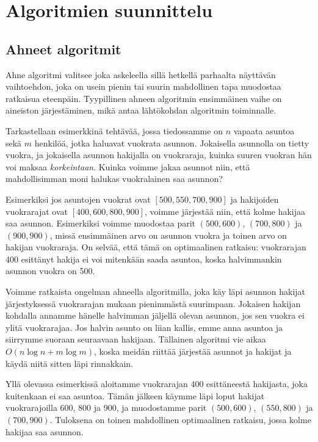 \chapter{Algoritmien suunnittelu}

\section{Ahneet algoritmit}

Ahne algoritmi valitsee joka askeleella sillä hetkellä parhaalta
näyttävän vaihtoehdon, joka on usein pienin tai suurin mahdollinen
tapa muodostaa ratkaisua eteenpäin.
Tyypillinen ahneen algoritmin ensimmäinen vaihe on aineiston
järjestäminen, mikä antaa lähtökohdan algoritmin toiminnalle.

Tarkastellaan esimerkkinä tehtävää, jossa tiedossamme on
$n$ vapaata asuntoa sekä $m$ henkilöä, jotka haluavat vuokrata asunnon.
Jokaisella asunnolla on tietty vuokra,
ja jokaisella asunnon hakijalla on vuokraraja,
kuinka suuren vuokran hän voi maksaa \emph{korkeintaan}.
Kuinka voimme jakaa asunnot niin, että mahdollisimman moni
halukas vuokralainen saa asunnon?

Esimerkiksi jos asuntojen vuokrat ovat $[500,550,700,900]$
ja hakijoiden vuokrarajat ovat $[400,600,800,900]$,
voimme järjestää niin, että kolme hakijaa saa asunnon.
Esimerkiksi voimme muodostaa parit $(500,600)$, $(700,800)$
ja $(900,900)$, missä ensimmäinen arvo on asunnon vuokra
ja toinen arvo on hakijan vuokraraja.
On selvää, että tämä on optimaalinen ratkaisu:
vuokrarajan 400 esittänyt hakija ei voi mitenkään saada asuntoa,
koska halvimmankin asunnon vuokra on 500.

Voimme ratkaista ongelman ahneella algoritmilla,
joka käy läpi asunnon hakijat järjestyksessä vuokrarajan
mukaan pienimmästä suurimpaan.
Jokaisen hakijan kohdalla annamme hänelle halvimman
jäljellä olevan asunnon, jos sen vuokra ei ylitä vuokrarajaa.
Jos halvin asunto on liian kallis, emme anna asuntoa ja
siirrymme suoraan seuraavaan hakijaan.
Tällainen algoritmi vie aikaa $O(n \log n + m \log m)$,
koska meidän riittää järjestää asunnot ja hakijat
ja käydä niitä sitten läpi rinnakkain.

Yllä olevassa esimerkissä aloitamme vuokrarajan 400
esittäneestä hakijasta, joka kuitenkaan ei saa asuntoa.
Tämän jälkeen käymme läpi loput hakijat
vuokrarajoilla 600, 800 ja 900, ja muodostamme parit
$(500,600)$, $(550,800)$ ja $(700,900)$.
Tuloksena on toinen mahdollinen optimaalinen ratkaisu,
jossa kolme hakijaa saa asunnon.

